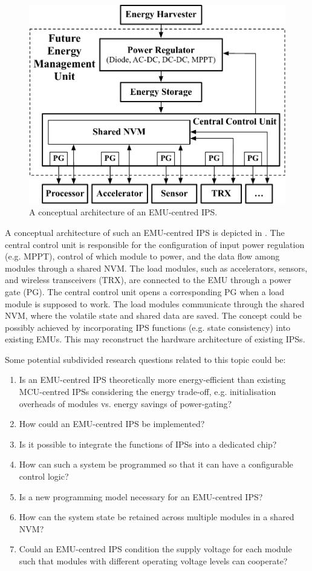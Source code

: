 \begin{figure}
    \centering
    \includegraphics[width=0.9\columnwidth]{ch6_conclusion/figures/EMUIPSarch.pdf}
    \caption{A conceptual architecture of an EMU-centred IPS.}
    \label{fig:emuips}
\end{figure}

A conceptual architecture of such an EMU-centred IPS is depicted in .
The central control unit is responsible for the configuration of input power regulation (e.g. MPPT), control of which module to power, and the data flow among modules through a shared NVM. 
The load modules, such as accelerators, sensors, and wireless transceivers (TRX), are connected to the EMU through a power gate (PG). 
The central control unit opens a corresponding PG when a load module is supposed to work.
The load modules communicate through the shared NVM, where the volatile state and shared data are saved. 
The concept could be possibly achieved by incorporating IPS functions (e.g. state consistency) into existing EMUs.
This may reconstruct the hardware architecture of existing IPSs.

Some potential subdivided research questions related to this topic could be:
\begin{enumerate}
    \item Is an EMU-centred IPS theoretically more energy-efficient than existing MCU-centred IPSs considering the energy trade-off, e.g. initialisation overheads of modules vs. energy savings of power-gating?
    \item How could an EMU-centred IPS be implemented?
    \item Is it possible to integrate the functions of IPSs into a dedicated chip?
    \item How can such a system be programmed so that it can have a configurable control logic?
    \item Is a new programming model necessary for an EMU-centred IPS?
    \item How can the system state be retained across multiple modules in a shared NVM?
    \item Could an EMU-centred IPS condition the supply voltage for each module such that modules with different operating voltage levels can cooperate? 
\end{enumerate}

